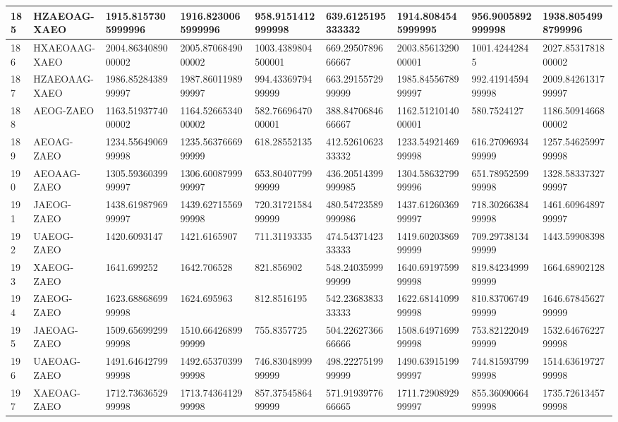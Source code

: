 {\begin{longtable}{|l|l|l|l|l|l|l|l|l|}
        185 & HZAEOAG-XAEO & 1915.8157305999996 & 1916.8230065999996 & 958.9151412999998 & 639.6125195333332 & 1914.8084545999995 & 956.9005892999998 & 1938.8054998799996 \\ \hline
        186 & HXAEOAAG-XAEO & 2004.8634089000002 & 2005.8706849000002 & 1003.4389804500001 & 669.2950789666667 & 2003.8561329000001 & 1001.42442845 & 2027.8531781800002 \\ \hline
        187 & HZAEOAAG-XAEO & 1986.8528438999997 & 1987.8601198999997 & 994.4336979499999 & 663.2915572999999 & 1985.8455678999997 & 992.4191459499998 & 2009.8426131799997 \\ \hline
        188 & AEOG-ZAEO & 1163.5193774000002 & 1164.5266534000002 & 582.7669647000001 & 388.8470684666667 & 1162.5121014000001 & 580.7524127 & 1186.5091466800002 \\ \hline
        189 & AEOAG-ZAEO & 1234.5564906999998 & 1235.5637666999999 & 618.28552135 & 412.5261062333332 & 1233.5492146999998 & 616.2709693499999 & 1257.5462599799998 \\ \hline
        190 & AEOAAG-ZAEO & 1305.5936039999997 & 1306.6008799999997 & 653.8040779999999 & 436.20514399999985 & 1304.5863279999996 & 651.7895259999998 & 1328.5833732799997 \\ \hline
        191 & JAEOG-ZAEO & 1438.6198796999997 & 1439.6271556999998 & 720.3172158499999 & 480.54723589999986 & 1437.6126036999997 & 718.3026638499998 & 1461.6096489799997 \\ \hline
        192 & UAEOG-ZAEO & 1420.6093147 & 1421.6165907 & 711.31193335 & 474.5437142333333 & 1419.6020386999999 & 709.2973813499999 & 1443.59908398 \\ \hline
        193 & XAEOG-ZAEO & 1641.699252 & 1642.706528 & 821.856902 & 548.2403599999999 & 1640.6919759999998 & 819.8423499999999 & 1664.68902128 \\ \hline
        194 & ZAEOG-ZAEO & 1623.6886869999998 & 1624.695963 & 812.8516195 & 542.2368383333333 & 1622.6814109999998 & 810.8370674999999 & 1646.6784562799999 \\ \hline
        195 & JAEOAG-ZAEO & 1509.6569929999998 & 1510.6642689999999 & 755.8357725 & 504.2262736666666 & 1508.6497169999998 & 753.8212204999999 & 1532.6467622799998 \\ \hline
        196 & UAEOAG-ZAEO & 1491.6464279999998 & 1492.6537039999998 & 746.8304899999999 & 498.2227519999999 & 1490.6391519999997 & 744.8159379999998 & 1514.6361972799998 \\ \hline
        197 & XAEOAG-ZAEO & 1712.7363652999998 & 1713.7436412999998 & 857.3754586499999 & 571.9193977666665 & 1711.7290892999997 & 855.3609066499998 & 1735.7261345799998 \\ \hline

\end{longtable}}
